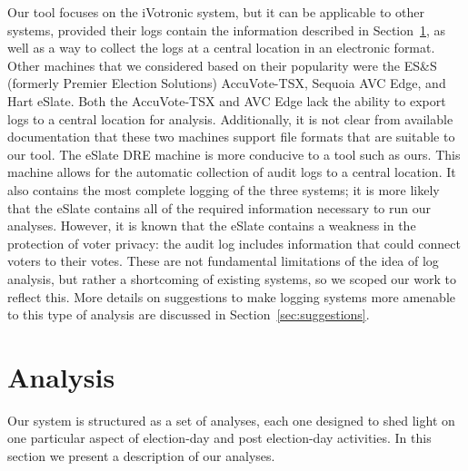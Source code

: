\documentclass[letterpaper,twocolumn,10pt]{article}
\begin{document}
Our tool focuses on the iVotronic system, but it can be applicable to other systems, provided their logs contain 
the information described in Section~\ref{sec:analysis}, as well as a way to collect the logs at a central 
location in an electronic format. Other machines that we considered based on their popularity were the ES\&S (formerly 
Premier Election Solutions) AccuVote-TSX, Sequoia AVC Edge, and Hart eSlate. Both the 
AccuVote-TSX and AVC Edge lack the ability to export logs to a central location for analysis. 
Additionally, it is not clear from available documentation that these two machines support 
file formats that are suitable to our tool. The eSlate DRE machine is more conducive to 
a tool such as ours. This machine allows for the automatic collection of audit logs to a 
central location. It also contains the most complete logging of the three systems; it is 
more likely that the eSlate contains all of the required information necessary to run our 
analyses.  
 However, it is known that the 
eSlate contains a weakness in the protection of voter privacy: the audit log includes information 
that could connect voters to their votes. 
 These are not fundamental limitations 
of the idea of log analysis, but rather a shortcoming of existing systems, so we scoped our work 
to reflect this. More details on suggestions to make logging systems more
amenable to this type of analysis are discussed in Section~\ref{sec:suggestions}.



\section{Analysis}
\label{sec:analysis}
Our system is structured as a set of analyses, each one designed to shed light
on one particular aspect of election-day and post election-day activities. In
this section we present a description of our analyses.
\end{document}
